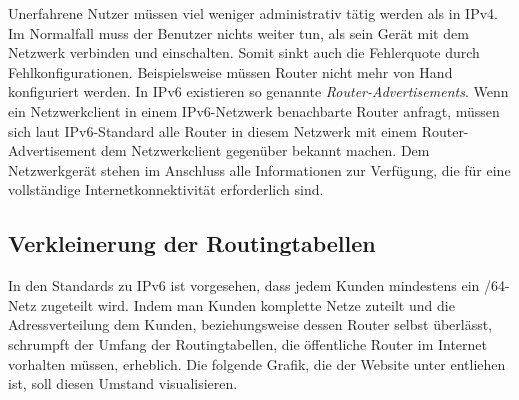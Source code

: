 \documentclass[a4paper,12pt]{scrartcl}
\begin{document}
Unerfahrene Nutzer m\"ussen viel weniger administrativ t\"atig werden als in IPv4. Im Normalfall muss der Benutzer nichts weiter tun, als sein Ger\"at mit dem Netzwerk verbinden und einschalten. Somit sinkt auch die Fehlerquote durch Fehlkonfigurationen. Beispielsweise m\"ussen Router nicht mehr von Hand konfiguriert werden. In IPv6 existieren so genannte \textit{Router-Advertisements}. Wenn ein Netzwerkclient in einem IPv6-Netzwerk benachbarte Router anfragt, m\"ussen sich laut IPv6-Standard alle Router in diesem Netzwerk mit einem Router-Advertisement dem Netzwerkclient gegen\"uber bekannt machen. Dem Netzwerkger\"at stehen im Anschluss alle Informationen zur Verf\"ugung, die f\"ur eine vollst\"andige Internetkonnektivit\"at erforderlich sind. 

\subsection{Verkleinerung der Routingtabellen}
In den Standards zu IPv6 ist vorgesehen, dass jedem Kunden mindestens ein /64-Netz zugeteilt wird. Indem man Kunden komplette Netze zuteilt und die Adressverteilung dem Kunden, beziehungsweise dessen Router selbst überlässt, schrumpft der Umfang der Routingtabellen, die öffentliche Router im Internet vorhalten müssen, erheblich. Die folgende Grafik, die der Website unter \cite{ipv4v6map} entliehen ist, soll diesen Umstand visualisieren.
\end{document}
